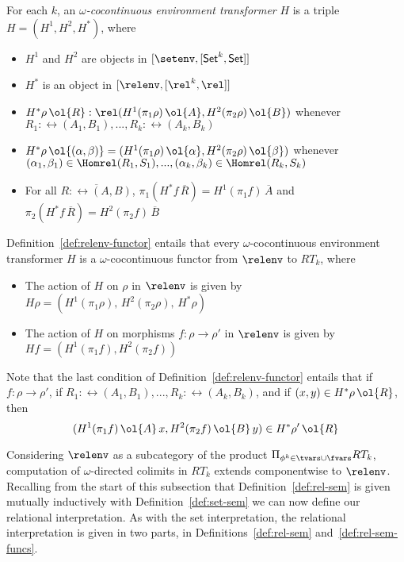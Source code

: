 \documentclass{lmcs}
\theoremstyle{plain}\newtheorem{satz}[thm]{Satz}
\newcommand{\set}{\mathsf{Set}}
\begin{document}
\begin{defi}\label{def:relenv-functor}
  For each $k$, an {\em $\omega$-cocontinuous environment transformer}
  $H$ is a triple $H = (H^1,H^2,H^*)$, where
\begin{itemize}
\item $H^1$ and $H^2$ are objects in $[\setenv,[\set^k,\set]]$
\item $H^*$ is an object in $[\relenv,[\rel^k,\rel]]$
\item $H^*\rho\, \ol{R} : \rel(H^1(\pi_1 \rho)\, \ol{A}, H^2(\pi_2
  \rho)\, \ol{B})$ whenever $R_1 : \rel(A_1,B_1),...,R_k :
  \rel(A_k,B_k)$
\item $H^*\rho\, \ol{(\alpha, \beta)} = (H^1(\pi_1 \rho)\,\ol{\alpha},
  H^2(\pi_2 \rho)\, \ol{\beta})$ whenever $(\alpha_1, \beta_1) \in
  \Homrel(R_1,S_1),..., (\alpha_k, \beta_k) \in \Homrel(R_k,S_k)$
\item For all $\overline{R : \rel(A,B)}$, $\pi_1(H^*f
  \,{\overline{R}}) = H^1 (\pi_1 f)\,{\overline{A}}$ and $\pi_2(H^*f
  \,{\overline{R}}) = H^2 (\pi_2 f)\,{\overline{B}}$
\end{itemize}
\end{defi}
\noindent
Definition~\ref{def:relenv-functor} entails that every
$\omega$-cocontinuous environment transformer $H$ is a
$\omega$-cocontinuous functor from $\relenv$ to $RT_k$, where
\begin{itemize}
\item The action of $H$ on $\rho$ in $\relenv$ is given by $H \rho = (H^1
  (\pi_1 \rho),\,H^2 (\pi_2 \rho),\,H^*\rho)$
\item The action of $H$ on morphisms $f : \rho \to \rho'$ in $\relenv$
  is given by $Hf = (H^1 (\pi_1 f),H^2 (\pi_2 f))$
\end{itemize}
\noindent
Note that the last condition of Definition~\ref{def:relenv-functor}
entails that if $f : \rho \to \rho'$, if
$R_1:\rel(A_1,B_1),...,R_k:\rel(A_k,B_k)$, and if $(x, y) \in
H^*\rho\,\ol{R}$, then \[(H^1(\pi_1 f)\,{\ol{A}}\,x, H^2(\pi_2
f)\,{\ol{B}}\,y) \in H^*\rho'\,\ol{R}\]

Considering $\relenv$ as a subcategory of the product $\Pi_{\phi^k \in
  \tvars \cup \fvars} RT_k$, computation of $\omega$-directed colimits
in $RT_k$ extends componentwise to $\relenv$. Recalling from the start
of this subsection that Definition~\ref{def:rel-sem} is given mutually
inductively with Definition~\ref{def:set-sem} we can now define our
relational interpretation. As with the set interpretation, the
relational interpretation is given in two parts, in
Definitions~\ref{def:rel-sem} and~\ref{def:rel-sem-funcs}.
\end{document}
